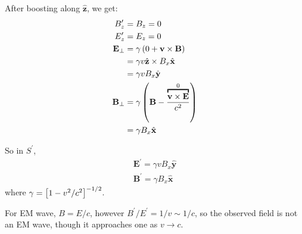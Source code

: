 \begin{parts}
	After boosting along $\hat{\mathbf{z}}$, we get:
	\begin{align*}
		B_z^\prime &= B_z = 0 \\
		E_z^\prime &= E_z = 0 \\
		\mathbf{E}_\perp &= \gamma \rbracket{0 + \mathbf{v}\times\mathbf{B}} \\
		&= \gamma v \hat{\mathbf{z}} \times B_x \hat{\mathbf{x}} \\
		&= \gamma v B_x \hat{\mathbf{y}} \\
		\mathbf{B}_\perp &= \gamma \rbracket{\mathbf{B} - \frac{\overbracket{\mathbf{v}\times\mathbf{E}}^{0}}{c^2}} \\
		&= \gamma B_x \hat{\mathbf{x}}
	\end{align*}
	
	So in $S^\prime$,
	\begin{gather*}
		\mathbf{E}^\prime = \gamma v B_x \hat{\mathbf{y}} \\
		\mathbf{B}^\prime = \gamma B_x \hat{\mathbf{x}}
	\end{gather*}
	where $\gamma = \left[1 - v^2 / c^2\right]^{-1/2}$.
	
	For EM wave, $B = E/c$, however $B^\prime / E^\prime = 1/v \sim 1/c$, so the observed field is not an EM wave, though it approaches one as $v \to c$.
\end{parts}